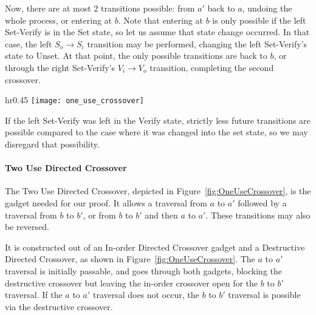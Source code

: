 Now, there are at most 2 transitions possible: from $a'$ back to $a$, undoing the whole process, or entering at $b$. Note that entering at $b$ is only possible if the left Set-Verify is in the Set state, so let us assume that state change occurred. In that case, the left $S_o \rightarrow S_i$ transition may be performed, changing the left Set-Verify's state to Unset. At that point, the only possible transitions are back to $b$, or through the right Set-Verify's
$V_i \rightarrow V_o$ transition, completing the second crossover.

\begin{wrapfigure}{hr}{0.45\textwidth}
\vspace{-5mm}
  \centering
    \texttt{[image: one\_use\_crossover]}
    \caption{The two use directed crossover is constructed from a directed destructive crossover and two in-order directed crossovers.}
    \label{fig:OneUseCrossover}
    \vspace{-7mm}
\end{wrapfigure}

If the left Set-Verify was left in the Verify state, strictly less future transitions are possible compared to the case where it was changed into the set state, so we may disregard that possibility.


\paragraph{Two Use Directed Crossover} 
The Two Use Directed Crossover, depicted in Figure~\ref{fig:OneUseCrossover}, is the gadget needed for our proof. It allows a traversal from $a$ to $a'$ followed by a traversal from $b$ to $b'$, or from $b$ to $b'$ and then $a$ to $a'$. These transitions may also be reversed.

It is constructed out of an In-order Directed Crossover gadget and a Destructive Directed Crossover, as shown in Figure~\ref{fig:OneUseCrossover}. The $a$ to $a'$ traversal is initially passable, and goes through both gadgets,
blocking the destructive crossover but leaving the in-order crossover open for the $b$ to $b'$ traversal. If the $a$ to $a'$ traversal does not occur, the $b$ to $b'$ traversal is possible via the destructive crossover.




